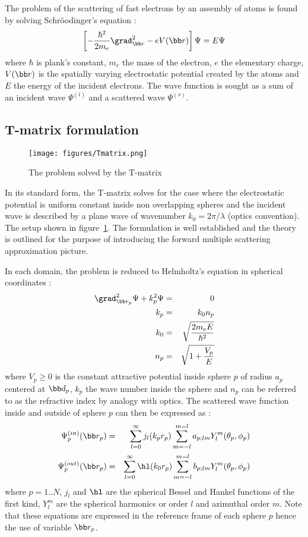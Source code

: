The problem of the scattering of fast electrons by an assembly of atoms is
found by solving Schr{\"o}odinger's equation :
%
\begin{equation}\label{eq:schro}
  \left[-\frac{\hbar^2}{2m_e}\grad_{\bb r}^2 - eV(\bb r) \right] \Psi = E\Psi
\end{equation}
%
where $\hbar$ is plank's constant, $m_e$ the mass of the electron,
$e$ the elementary charge, $V(\bb r)$ is the spatially varying electrostatic
potential created by the atoms and $E$ the energy of the incident electrons.
The wave function is sought as a sum of an incident wave $\Psi^{(i)}$
and a scattered wave $\Psi^{(s)}$.

\subsection{T-matrix formulation}

\begin{figure}
  \centering
  \texttt{[image: figures/Tmatrix.png]}
\caption{The problem solved by the T-matrix}\label{fig:Tmatrix}
\end{figure}

In its standard form, the T-matrix solves for the case where the electrostatic
potential is uniform constant inside non overlapping spheres and the
incident wave is described by a plane wave of wavenumber $k_0=2\pi/\lambda$
(optics convention).
The setup shown in figure~\ref{fig:Tmatrix}.
The formulation is well established and the theory is outlined for the purpose
of introducing the forward multiple scattering approximation picture.

In each domain, the problem is reduced to Helmholtz's equation
in spherical coordinates  :
%
\begin{eqnarray*}
  \grad_{\bb r_p}^2\Psi + k_p^2 \Psi &=& 0\\
  k_p &=& k_0n_p\\
  k_0 &=& \sqrt{\frac{2m_eE}{\hbar^2}}\\
  n_p &=& \sqrt{1+\frac{V_p}{E}}
\end{eqnarray*}
%
where $V_p\ge 0$ is the constant attractive potential inside sphere $p$ of radius
$a_p$ centered at $\bb d_p$, $k_p$ the wave number inside the sphere and $n_p$
can be referred to as the refractive index by analogy with optics.
The scattered wave function inside and outside of sphere $p$ can then be expressed
as :
%
\begin{eqnarray*}
  \Psi_p^{(in )}(\bb r_p) &=& \sum_{l=0}^{\infty}j_l(k_pr_p)\sum_{m=-l}^{m=l}a_{p;lm}Y_l^m(\theta_p,\phi_p)\\
  \Psi_p^{(out)}(\bb r_p) &=& \sum_{l=0}^{\infty}\hl(k_0r_p)\sum_{m=-l}^{m=l}b_{p;lm}Y_l^m(\theta_p,\phi_p)\\
\end{eqnarray*}
%
where $p=1..N$,
$j_l$ and $\hl$ are the spherical Bessel and Hankel functions of the first
kind, $Y_l^m$ are the spherical harmonics or order $l$ and azimuthal order $m$.
Note that these equations are expressed in the reference frame of each
sphere $p$ hence the use of variable $\bb r_p$.

